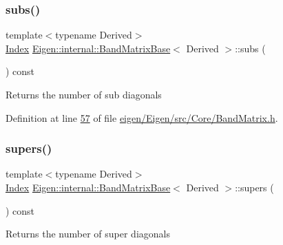 \subsubsection{\texorpdfstring{subs()}{subs()}\hspace{0.1cm}{\footnotesize\ttfamily [2/2]}}
{\footnotesize\ttfamily template$<$typename Derived$>$ \\
\hyperlink{group___core___module_a554f30542cc2316add4b1ea0a492ff02}{Index} \hyperlink{class_eigen_1_1internal_1_1_band_matrix_base}{Eigen\+::internal\+::\+Band\+Matrix\+Base}$<$ Derived $>$\+::subs (\begin{DoxyParamCaption}{ }\end{DoxyParamCaption}) const\hspace{0.3cm}{\ttfamily [inline]}}

\begin{DoxyReturn}{Returns}
the number of sub diagonals 
\end{DoxyReturn}


Definition at line \hyperlink{eigen_2_eigen_2src_2_core_2_band_matrix_8h_source_l00057}{57} of file \hyperlink{eigen_2_eigen_2src_2_core_2_band_matrix_8h_source}{eigen/\+Eigen/src/\+Core/\+Band\+Matrix.\+h}.

\mbox{\label{class_eigen_1_1internal_1_1_band_matrix_base_a58617da0d75d22b1f8dfdfde702ebb4a}} 
\subsubsection{\texorpdfstring{supers()}{supers()}\hspace{0.1cm}{\footnotesize\ttfamily [1/2]}}
{\footnotesize\ttfamily template$<$typename Derived$>$ \\
\hyperlink{group___core___module_a554f30542cc2316add4b1ea0a492ff02}{Index} \hyperlink{class_eigen_1_1internal_1_1_band_matrix_base}{Eigen\+::internal\+::\+Band\+Matrix\+Base}$<$ Derived $>$\+::supers (\begin{DoxyParamCaption}{ }\end{DoxyParamCaption}) const\hspace{0.3cm}{\ttfamily [inline]}}

\begin{DoxyReturn}{Returns}
the number of super diagonals 
\end{DoxyReturn}


